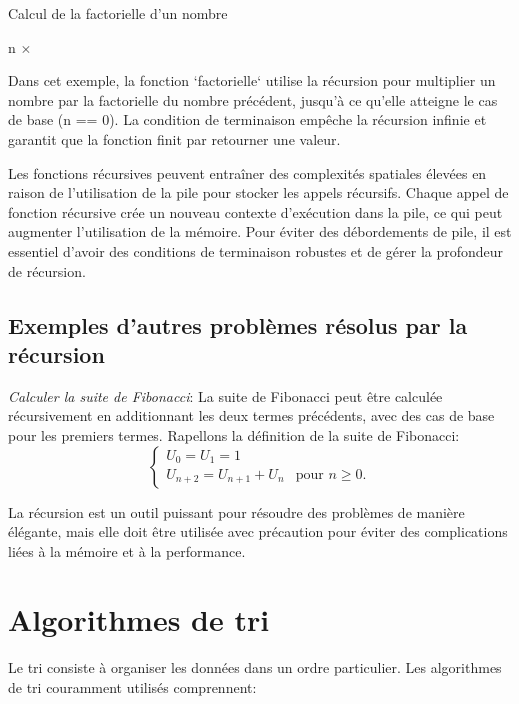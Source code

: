 \begin{algorithm}
	\caption{Calcul de la factorielle d'un nombre}
	\begin{algorithmic}
		\State {}
		\Else
		\State \Return n $\times$ 
	    \EndIf
		\EndFunction
	\end{algorithmic}
\end{algorithm}

Dans cet exemple, la fonction `factorielle` utilise la récursion pour multiplier un nombre par la factorielle du nombre précédent, jusqu'à ce qu'elle atteigne le cas de base (n == 0). La condition de terminaison empêche la récursion infinie et garantit que la fonction finit par retourner une valeur.

Les fonctions récursives peuvent entraîner des complexités spatiales élevées en raison de l'utilisation de la pile pour stocker les appels récursifs. Chaque appel de fonction récursive crée un nouveau contexte d'exécution dans la pile, ce qui peut augmenter l'utilisation de la mémoire. Pour éviter des débordements de pile, il est essentiel d'avoir des conditions de terminaison robustes et de gérer la profondeur de récursion.

\subsection*{Exemples d'autres problèmes résolus par la récursion}
\textit{Calculer la suite de Fibonacci}: La suite de Fibonacci peut être calculée récursivement en additionnant les deux termes précédents, avec des cas de base pour les premiers termes. Rapellons la d\'efinition de la suite de Fibonacci: 
\[ \begin{cases}
	U_0 = U_1 = 1 & \\
	U_{n+2} = U_{n+1} + U_{n} & \text{pour } n\ge 0.
\end{cases} \]


La récursion est un outil puissant pour résoudre des problèmes de manière élégante, mais elle doit être utilisée avec précaution pour éviter des complications liées à la mémoire et à la performance.

\section{Algorithmes de tri}

Le tri consiste à organiser les données dans un ordre particulier. Les algorithmes de tri couramment utilisés comprennent:

